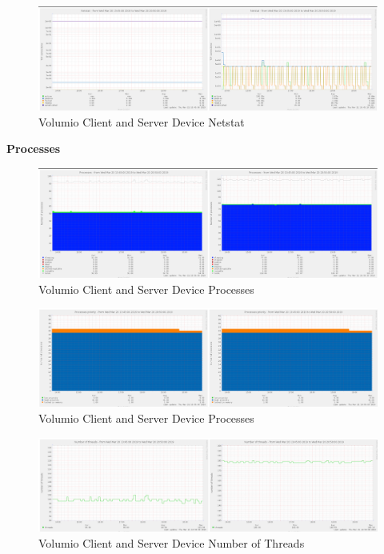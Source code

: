 \documentclass[11pt,a4paper]{scrreprt}
\begin{document}
\begin{figure}[H]
\includegraphics{ResultsAndAnalysis/VolumioServerTestImages/018VolumioNetstat.png}
\centering
\caption{Volumio Client and Server Device Netstat}
\label{VolumioNetstat}
\end{figure}

\textbf{Processes}

\begin{figure}[H]
\includegraphics{ResultsAndAnalysis/VolumioServerTestImages/020VolumioProcesses.png}
\centering
\caption{Volumio Client and Server Device Processes}
\label{VolumioProcesses}
\end{figure}

\begin{figure}[H]
\includegraphics{ResultsAndAnalysis/VolumioServerTestImages/021VolumioProcessPriority.png}
\centering
\caption{Volumio Client and Server Device Processes}
\label{VolumioProcessPriority}
\end{figure}

\begin{figure}[H]
\includegraphics{ResultsAndAnalysis/VolumioServerTestImages/019VolumioNoOfThreads.png}
\centering
\caption{Volumio Client and Server Device Number of Threads}
\label{VolumioNumThreads}
\end{figure}
\end{document}
